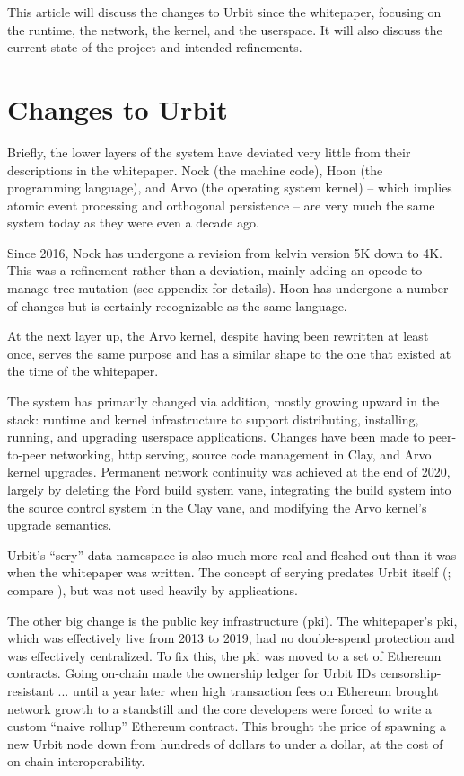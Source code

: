 \documentclass[twoside]{article}
\begin{document}
\noindent
This article will discuss the changes to Urbit since the whitepaper, focusing on the runtime, the network, the kernel, and the userspace.  It will also discuss the current state of the project and intended refinements.


\section{Changes to Urbit}

Briefly, the lower layers of the system have deviated very little from their descriptions in the whitepaper.  Nock (the machine code), Hoon (the programming language), and Arvo (the operating system kernel) – which implies atomic event processing and orthogonal persistence – are very much the same system today as they were even a decade ago.

Since 2016, Nock has undergone a revision from kelvin version 5K down to 4K.  This was a refinement rather than a deviation, mainly adding an opcode to manage tree mutation (see appendix for details).  Hoon has undergone a number of changes but is certainly recognizable as the same language.

At the next layer up, the Arvo kernel, despite having been rewritten at least once, serves the same purpose and has a similar shape to the one that existed at the time of the whitepaper.

\sloppy
The system has primarily changed via addition, mostly growing upward in the stack: runtime and kernel infrastructure to support distributing, installing, running, and upgrading user\-space applications.  Changes have been made to peer-to-peer networking, {\sc http} serving, source code management in Clay, and Arvo kernel upgrades.  Permanent network continuity was achieved at the end of 2020, largely by deleting the Ford build system vane, integrating the build system into the source control system in the Clay vane, and modifying the Arvo kernel's upgrade semantics.

Urbit's ``scry'' data namespace is also much more real and fleshed out than it was when the whitepaper was written.  The concept of scrying predates Urbit itself (\citet{Yarvin2006a}; compare \citet{Yarvin2010}), but was not used heavily by applications.

The other big change is the public key infrastructure ({\sc pki}).  The whitepaper's {\sc pki}, which was effectively live from 2013 to 2019, had no double-spend protection and was effectively centralized.  To fix this, the {\sc pki} was moved to a set of Ethereum contracts.  Going on-chain made the ownership ledger for Urbit IDs censorship-resistant ... until a year later when high transaction fees on Ethereum brought network growth to a standstill and the core developers were forced to write a custom ``naive rollup'' Ethereum contract.  This brought the price of spawning a new Urbit node down from hundreds of dollars to under a dollar, at the cost of on-chain interoperability.
\end{document}
